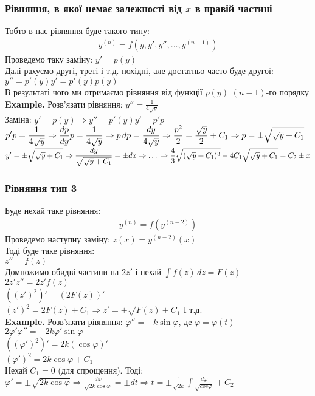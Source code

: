 \documentclass[a4paper, 14pt]{extarticle}
\def\huge{\displaystyle}
\def\bigline{\vspace{5mm}\\}
\begin{document}
	\subsubsection{Рівняння, в якої немає залежності від $x$ в правій частині}
	Тобто в нас рівняння буде такого типу:
	\begin{align*}
	y^{(n)} = f(y,y',y'',\dots, y^{(n-1)})
	\end{align*}
	Проведемо таку заміну: $y' = p(y)$\\
	Далі рахуємо другі, треті і т.д. похідні, але достатньо часто буде другої:\\
	$y'' = p'(y)y'=p'(y)p(y)$\\
	В результаті чого ми отримаємо рівняння від функції $p(y)$ $(n-1)$-го порядку
	\bigline
	\textbf{Example.} Розв'язати рівняння: $\huge y'' = \frac{1}{4\sqrt{y}}$\\
	Заміна: $y'=p(y) \Rightarrow y''=p'(y)y'=p'p$\\
	$\huge p'p = \frac{1}{4\sqrt{y}} \Rightarrow \frac{dp}{dy} p = \frac{1}{4\sqrt{y}} \Rightarrow p\,dp = \frac{dy}{4\sqrt{y}} \Rightarrow \frac{p^2}{2} = \frac{\sqrt{y}}{2} + C_1 \Rightarrow \\ p = \pm \sqrt{\sqrt{y}+C_1}$\\
	$\huge y' = \pm \sqrt{\sqrt{y}+C_1} \Rightarrow \frac{dy}{\sqrt{\sqrt{y}+C_1}} = \pm dx \Rightarrow \dots \\ \Rightarrow \frac{4}{3}\sqrt{(\sqrt{y}+C_1)^3} - 4C_1\sqrt{\sqrt{y}+C_1} = C_2 \pm x$
	
	\subsubsection{Рівняння тип 3}
	Буде нехай таке рівняння:
	\begin{align*}
	y^{(n)} = f(y^{(n-2)})
	\end{align*}
	Проведемо наступну заміну: $z(x) = y^{(n-2)}(x)$\\
	Тоді буде таке рівняння:\\
	$z'' = f(z)$\\
	Домножимо обидві частини на $2z'$ і нехай $\huge \int f(z)\,dz = F(z)$\\
	$2z'z'' = 2z'f(z)$\\
	$((z')^2)' = (2F(z))'$\\
	$(z')^2 = 2F(z) + C_1 \Rightarrow z' = \huge \pm \sqrt{F(z)+C_1}$ І т.д.
	\bigline
	\textbf{Example.} Розв'язати рівняння: $\varphi'' = -k \sin \varphi$, де $\varphi = \varphi(t)$\\
	$2 \varphi' \varphi'' = -2k \varphi' \sin \varphi$\\
	$((\varphi')^2)' = 2k(\cos \varphi)'$\\
	$(\varphi')^2 = 2k\cos \varphi + C_1$\\
	Нехай $C_1 = 0$ (для спрощення). Тоді:\\
	$\varphi' = \pm \sqrt{2k\cos \varphi} \Rightarrow \huge \frac{d\varphi}{\sqrt{2k \cos \varphi}} = \pm dt \Rightarrow t = \pm \frac{1}{\sqrt{2k}} \int \frac{d\varphi}{\sqrt{cos\varphi}} + C_2$
	\newpage
	
\end{document}
